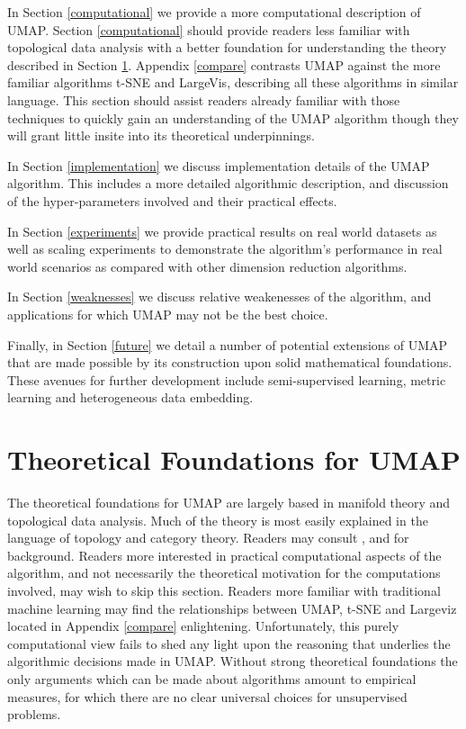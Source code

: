 \documentclass[12pt]{article}
\begin{document}
In Section \ref{computational} we provide a more computational description of UMAP.   Section \ref{computational} should provide readers less familiar with topological data analysis with a better foundation for understanding the theory described in Section \ref{theory}.  Appendix \ref{compare} contrasts UMAP against the more familiar algorithms t-SNE and LargeVis, describing all these algorithms in similar language. This section should assist readers already familiar with those techniques to quickly gain an understanding of the UMAP algorithm though they will grant little insite into its theoretical underpinnings.

In Section \ref{implementation} we discuss implementation details of the UMAP algorithm. This includes a more detailed algorithmic description, and discussion of the hyper-parameters involved and their practical effects.

In Section \ref{experiments} we provide practical results on real world datasets as well as scaling experiments to demonstrate the algorithm's performance in real world scenarios as compared with other dimension reduction algorithms. 

In Section \ref{weaknesses} we discuss relative weakenesses of the algorithm, and applications for which UMAP may not be the best choice.

Finally, in Section \ref{future} we detail a number of potential extensions of UMAP that are made possible by its construction upon solid mathematical foundations.  These avenues for further development include semi-supervised learning, metric learning and heterogeneous data embedding.  

\section{Theoretical Foundations for UMAP}\label{theory}

The theoretical foundations for UMAP are largely based in manifold theory and topological data analysis. Much of the theory is most easily explained in the language of topology and category theory. Readers may consult \cite{mac2013categories}, \cite{riehl2017category} and \cite{may1992simplicial} for background. Readers more interested in practical computational aspects of the algorithm, and not necessarily the theoretical motivation for the computations involved, may wish to skip this section.  Readers more familiar with traditional machine learning may find the relationships between UMAP, t-SNE and Largeviz located in Appendix {\ref{compare}} enlightening.  Unfortunately, this purely computational view fails to shed any light upon the reasoning that underlies the algorithmic decisions made in UMAP.  Without strong theoretical foundations the only arguments which can be made about algorithms amount to empirical measures, for which there are no clear universal choices for unsupervised problems.
\end{document}
